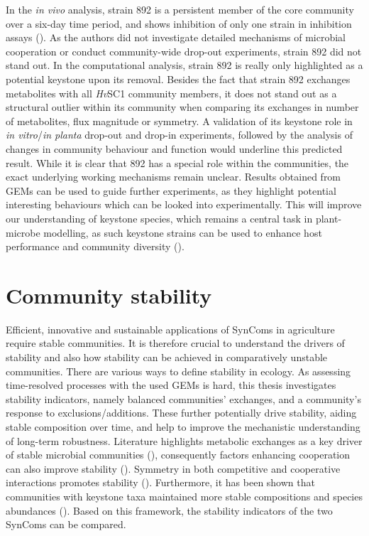 In the \textit{in vivo }analysis, strain 892 is a persistent member of the core community over a six-day time period, and shows inhibition of only one strain in inhibition assays (\cite{mahdi_low_2026}). As the authors did not investigate detailed mechanisms of microbial cooperation or conduct community-wide drop-out experiments, strain 892 did not stand out. In the computational analysis, strain 892 is really only highlighted as a potential keystone upon its removal.  Besides the fact that strain 892 exchanges metabolites with all \textit{Hv}SC1 community members, it does not stand out as a structural outlier within its community when comparing its exchanges in number of metabolites, flux magnitude or symmetry. A validation of its keystone role in \textit{in vitro}/\textit{in planta} drop-out and drop-in experiments, followed by the analysis of changes in community behaviour and function would underline this predicted result.  
While it is clear that 892 has a special role within the communities, the exact underlying working mechanisms remain unclear. Results obtained from GEMs can be used to guide further experiments, as they highlight potential interesting behaviours which can be looked into experimentally. This will improve our understanding of keystone species, which remains a central task in plant-microbe modelling, as such keystone strains can be used to enhance host performance and community diversity (\cite{krumbach_metabolic_2021}).

\section{Community stability}
Efficient, innovative and sustainable applications of SynComs in agriculture require stable communities. It is therefore crucial to understand the drivers of stability and also how stability can be achieved in comparatively unstable communities. There are various ways to define stability in ecology. As assessing time-resolved processes with the used GEMs is hard, this thesis investigates stability indicators, namely balanced communities’ exchanges, and a community’s response to exclusions/additions. These further potentially drive stability, aiding stable composition over time, and help to improve the mechanistic understanding of long-term robustness. Literature highlights metabolic exchanges as a key driver of stable microbial communities (\cite{zelezniak_metabolic_2015}), consequently factors enhancing cooperation can also improve stability (\cite{wang_narrow-spectrum_2025}). Symmetry in both competitive and cooperative interactions promotes stability (\cite{butler_stability_2018}). Furthermore, it has been shown that communities with keystone taxa maintained more stable compositions and species abundances (\cite{liu_keystone_2025}). Based on this framework, the stability indicators of the two SynComs can be compared. 
\\


